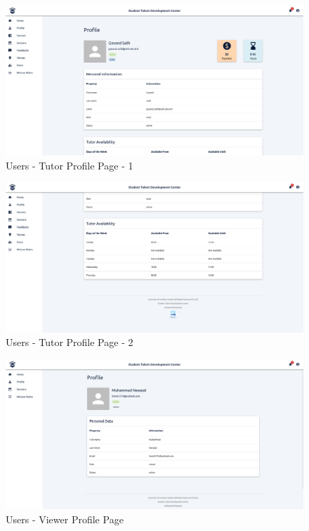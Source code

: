 \begin{justify}
    \begin{figure}[H]
        \centerline{\includegraphics[width=150mm,scale=1]{figures/implementation_and_testing/implementation/frontend/pages/Users - Tutor Profile 1.png}}
        \caption{Users - Tutor Profile Page - 1}
    \end{figure}

    \begin{figure}[H]
        \centerline{\includegraphics[width=150mm,scale=1]{figures/implementation_and_testing/implementation/frontend/pages/Users - Tutor Profile 2.png}}
        \caption{Users - Tutor Profile Page - 2}
    \end{figure}

    \begin{figure}[H]
        \centerline{\includegraphics[width=150mm,scale=1]{figures/implementation_and_testing/implementation/frontend/pages/Viewer Profile.png}}
        \caption{Users - Viewer Profile Page}
    \end{figure}



\end{justify}
